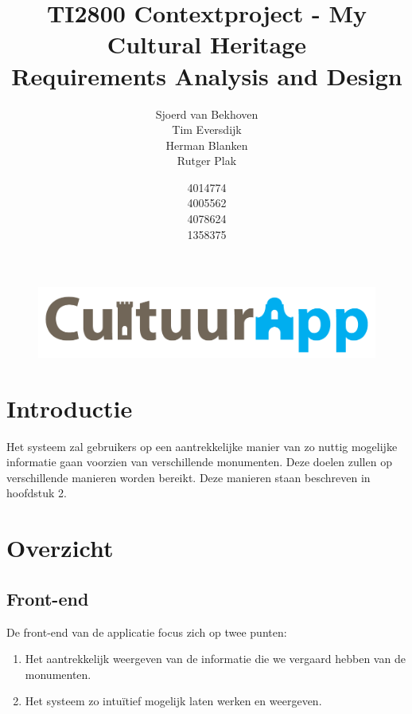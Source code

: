 \documentclass[a4paper,10pt]{article}
\begin{document}
\title{TI2800 Contextproject - My Cultural Heritage\\ Requirements Analysis and Design}
\author{Sjoerd van Bekhoven\\ Tim Eversdijk \\ Herman Blanken \\ Rutger Plak \and 4014774 \\ 4005562 \\ 4078624 \\ 1358375}

\maketitle
\setcounter{page}{0}
\thispagestyle{empty}
\vspace{10cm}
		\begin{figure}[ht!]
				\centering
				\includegraphics[width=\textwidth]{cultuurapp-logo.png}
			\end{figure}
\clearpage

\tableofcontents

\clearpage
\section{Introductie}
Het systeem zal gebruikers op een aantrekkelijke manier van zo nuttig mogelijke informatie gaan voorzien van verschillende monumenten. Deze doelen zullen op verschillende manieren worden bereikt. Deze manieren staan beschreven in hoofdstuk 2.

\clearpage
	\section{Overzicht}
		\subsection{Front-end}
			De front-end van de applicatie focus zich op twee punten:
			\begin{enumerate}
				\item Het aantrekkelijk weergeven van de informatie die we vergaard hebben van de monumenten.
				\item Het systeem zo intu\"itief mogelijk laten werken en weergeven.
			\end{enumerate}
				
\end{document}
